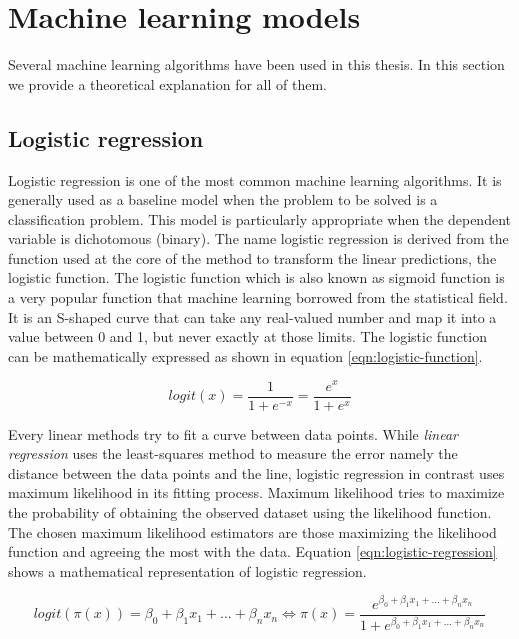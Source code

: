 \documentclass[LaM,binding=0.6cm, english]{sapthesis}
\begin{document}
\section{Machine learning models}

Several machine learning algorithms have been used in this thesis. In this section we provide a theoretical explanation for all of them.

\subsection{Logistic regression} \label{lr_model}

Logistic regression is one of the most common machine learning algorithms. It is generally used as a baseline model when the problem to be solved is a classification problem. This model is particularly appropriate when the dependent variable is dichotomous (binary).\cite{Sahar2018} The name logistic regression is derived from the function used at the core of the method to transform the linear predictions, the logistic function. The logistic function which is also known as sigmoid function is a very popular function that machine learning borrowed from the statistical field. It is an S-shaped curve that can take any real-valued number and map it into a value between 0 and 1, but never exactly at those limits. The logistic function can be mathematically expressed as shown in equation \ref{eqn:logistic-function}.

\begin{equation}
\label{eqn:logistic-function}
logit(x) = \frac{1}{1 + e^{-x}} = \frac{e^x}{1 + e^x}
\end{equation}

\par Every linear methods try to fit a curve between data points. While \textit{linear regression} uses the least-squares method to measure the error namely the distance between the data points and the line, logistic regression in contrast uses maximum likelihood in its fitting process. Maximum likelihood tries to maximize the probability of obtaining the observed dataset using the likelihood function. The chosen maximum likelihood estimators are those maximizing the likelihood function and agreeing the most with the data. Equation \ref{eqn:logistic-regression} shows a mathematical representation of logistic regression.

\begin{equation}
\label{eqn:logistic-regression}
logit(\pi(x)) = \beta_0 + \beta_1x_1 + ... + \beta_nx_n \Longleftrightarrow \pi(x) = \frac{e^{\beta_0 + \beta_1x_1 + ... + \beta_nx_n}}{1 + e^{\beta_0 + \beta_1x_1 + ... + \beta_nx_n}}
\end{equation}
\end{document}
